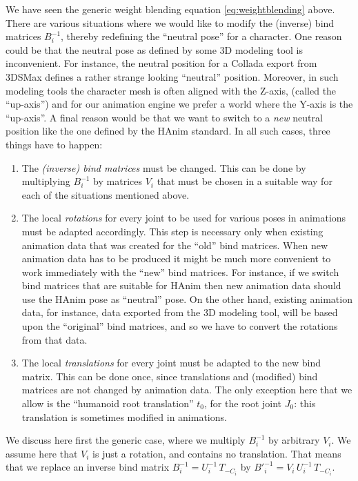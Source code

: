 We have seen the generic weight blending equation \ref{eq:weightblending} above.
There are various situations where we would like to modify the (inverse) bind matrices $B_i^{-1}$,
thereby redefining the ``neutral pose'' for a character.
One reason could be that the neutral pose as defined by some 3D modeling tool is inconvenient.
For instance, the neutral position for a Collada export from 3DSMax defines a rather strange looking ``neutral'' position.
Moreover, in such modeling tools the character mesh is often aligned with the Z-axis, (called the ``up-axis'') and for our animation engine
we prefer a world where the Y-axis is the ``up-axis''. A final reason would be
that we want to switch to a \emph{new} neutral position like the one defined by the HAnim standard.
In all such cases, three things have to happen:
\begin{enumerate}
\item The \emph{(inverse) bind matrices} must be changed. This can be done by multiplying $B_i^{-1}$
by matrices $V_i$ that must be chosen in a suitable way for each of the situations mentioned above.
\item The local \emph{rotations} for every joint to be used for various poses in animations must be adapted accordingly.
This step is necessary only when existing animation data that was created for the ``old'' bind matrices.
When new animation data has to be produced it might be much more convenient to work immediately with
the ``new'' bind matrices. For instance, if we switch bind matrices that are suitable for HAnim then
new animation data should use the HAnim pose as ``neutral'' pose. On the other hand, existing animation data,
for instance, data exported from the 3D modeling tool, will be based upon the ``original'' bind matrices, and so
we have to convert the rotations from that data.
\item The local \emph{translations} for every joint must be adapted to the new bind matrix.
This can be done once, since translations and (modified) bind matrices are not changed by animation data.
The only exception here that we allow is the ``humanoid root translation'' $t_0$, for the root joint $J_0$:
this translation is sometimes modified in animations.
\end{enumerate}
%
We discuss here first the generic case, where we multiply $B_i^{-1}$ by arbitrary $V_i$.
We assume here that $V_i$ is just a rotation, and contains no translation.
That means that we replace an inverse bind matrix $B_i^{-1} = U_i^{-1}\,T_{-C_i}$
by ${B'}_i^{-1} = V_i\,U_i^{-1}\,T_{-C_i}$.

